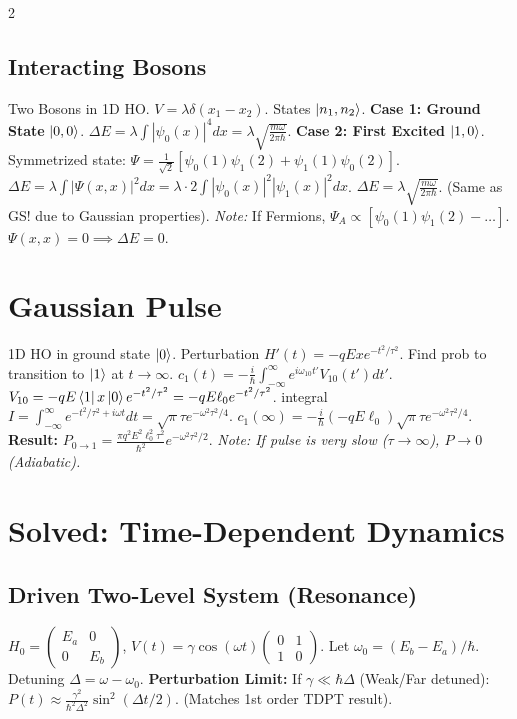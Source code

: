\documentclass[9pt,a4paper]{article} %
\begin{document}
\begin{multicols}{2}
\subsection{ Interacting Bosons}
Two Bosons in 1D HO. $V = \lambda \delta(x_1-x_2)$.
States $\ket{n_1, n_2}$.
\textbf{Case 1: Ground State} $\ket{0,0}$.
$\Delta E = \lambda \int |\psi_0(x)|^4 dx = \lambda \sqrt{\frac{m\omega}{2\pi\hbar}}$.
\textbf{Case 2: First Excited} $\ket{1,0}$.
Symmetrized state: $\Psi = \frac{1}{\sqrt{2}}[\psi_0(1)\psi_1(2) + \psi_1(1)\psi_0(2)]$.
$\Delta E = \lambda \int |\Psi(x,x)|^2 dx = \lambda \cdot 2 \int |\psi_0(x)|^2 |\psi_1(x)|^2 dx$.
$\Delta E = \lambda \sqrt{\frac{m\omega}{2\pi\hbar}}$. (Same as GS! due to Gaussian properties).
\textit{Note:} If Fermions, $\Psi_A \propto [\psi_0(1)\psi_1(2) - \dots]$. $\Psi(x,x)=0 \implies \Delta E = 0$.
\section{Gaussian Pulse}

1D HO in ground state $\ket{0}$. Perturbation $H'(t) = -q E x e^{-t^2/\tau^2}$.
Find prob to transition to $\ket{1}$ at $t \to \infty$.
$c_1(t) = -\frac{i}{\hbar} \int_{-\infty}^{\infty} e^{i\omega_{10}t'} V_{10}(t') dt'$.
$V_{10} = -qE \bra{1}x\ket{0} e^{-t^2/\tau^2} = -qE \ell_0 e^{-t^2/\tau^2}$.
integral $I = \int_{-\infty}^{\infty} e^{-t^2/\tau^2 + i\omega t} dt = \sqrt{\pi}\tau e^{-\omega^2\tau^2/4}$.
$c_1(\infty) = -\frac{i}{\hbar}(-qE\ell_0) \sqrt{\pi}\tau e^{-\omega^2\tau^2/4}$.
\textbf{Result:} $P_{0\to 1} = \frac{\pi q^2 E^2 \ell_0^2 \tau^2}{\hbar^2} e^{-\omega^2\tau^2/2}$.
\textit{Note: If pulse is very slow ($\tau \to \infty$), $P \to 0$ (Adiabatic).}

\section{ Solved: Time-Dependent Dynamics}

\subsection{ Driven Two-Level System (Resonance)}
$H_0 = \begin{pmatrix} E_a & 0 \\ 0 & E_b \end{pmatrix}$, $V(t) = \gamma \cos(\omega t) \begin{pmatrix} 0 & 1 \\ 1 & 0 \end{pmatrix}$.
Let $\omega_0 = (E_b - E_a)/\hbar$. Detuning $\Delta = \omega - \omega_0$.
\textbf{Perturbation Limit:} If $\gamma \ll \hbar\Delta$ (Weak/Far detuned):
$P(t) \approx \frac{\gamma^2}{\hbar^2 \Delta^2} \sin^2(\Delta t / 2)$.
(Matches 1st order TDPT result).


\end{multicols}
\end{document}
